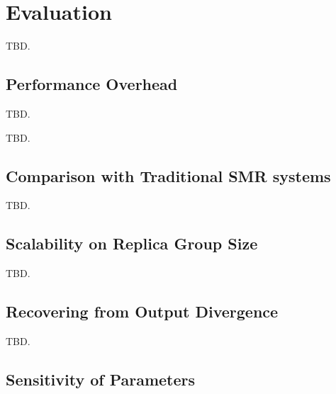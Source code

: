 \section{Evaluation} \label{sec:evaluation}
TBD.

\subsection{Performance Overhead} \label{sec:overhead}

TBD.

TBD.

\subsection{Comparison with Traditional SMR systems} \label{sec:compare}

TBD.

\subsection{Scalability on Replica Group Size} \label{sec:scalability}

TBD.

\subsection{Recovering from Output Divergence} \label{sec:robust}

TBD.

\subsection{Sensitivity of Parameters} \label{sec:sensitivity}

 

